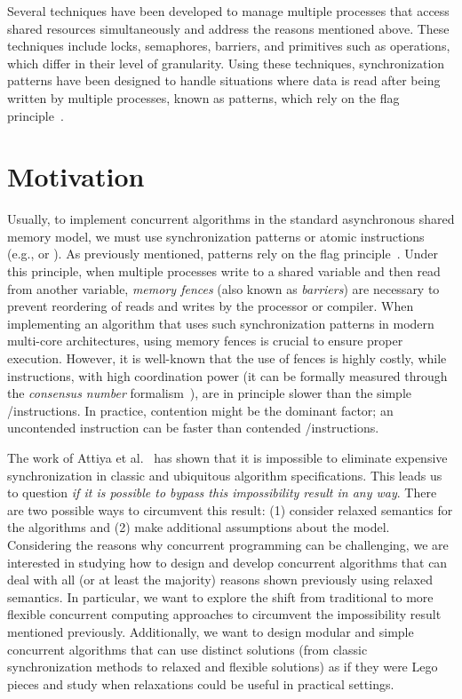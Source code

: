 Several techniques have been developed to manage multiple processes that access shared resources simultaneously and address the reasons mentioned above. These techniques include locks, semaphores, barriers, and primitives such as \RMW operations, which differ in their level of granularity. Using these techniques, synchronization patterns have been designed to handle situations where data is read after being written by multiple processes, known as \RAW patterns, which rely on the flag principle~\cite{DBLP_books_daglib_0020056}.


\section{\label{section:Motivation}Motivation}

Usually, to implement concurrent algorithms in the standard asynchronous shared memory model, we must use \RAW synchronization patterns or atomic \RMW instructions (e.g., \CAS or \TAS). As previously mentioned, \RAW patterns rely on the flag principle~\cite{DBLP_books_daglib_0020056}. Under this principle, when multiple processes write to a shared variable and then read from another variable, \textit{memory fences} (also known as \textit{barriers}) are necessary to prevent reordering of reads and writes by the processor or compiler. When implementing an algorithm that uses such synchronization patterns in modern multi-core architectures, using memory fences is crucial to ensure proper execution. However, it is well-known that the use of fences is highly costly, while \RMW instructions, with high coordination power (it can be formally measured through the \textit{consensus number} formalism~\cite{DBLP_journals_toplas_Herlihy91}), are in principle slower than the simple \R/\W instructions. In practice, contention might be the dominant factor; an uncontended \RMW instruction can be faster than contended \R/\W instructions.

The work of Attiya et al.~\cite{DBLP_conf_popl_AttiyaGHKMV11} has shown that it is impossible to eliminate expensive synchronization in classic and ubiquitous algorithm specifications. This leads us to question \textit{if it is possible to bypass this impossibility result in any way}. There are two possible ways to circumvent this result: (1) consider relaxed semantics for the algorithms and (2) make additional assumptions about the model. Considering the reasons why concurrent programming can be challenging, we are interested in studying how to design and develop concurrent algorithms that can deal with all (or at least the majority) reasons shown previously using relaxed semantics. In particular, we want to explore the shift from traditional to more flexible concurrent computing approaches to circumvent the impossibility result mentioned previously. Additionally, we want to design modular and simple concurrent algorithms that can use distinct solutions (from classic synchronization methods to relaxed and flexible solutions) as if they were Lego pieces and study when relaxations could be useful in practical settings.

